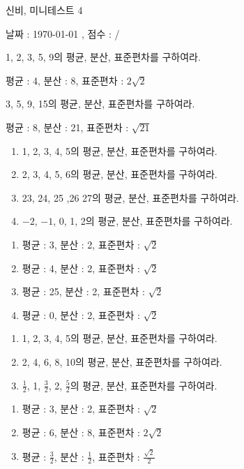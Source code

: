 \documentclass[a4paper]{oblivoir}
\begin{document}
\begin{center}
\LARGE 신비, 미니테스트 4
\end{center}
\begin{center}
날짜 : \today
,\qquad
점수 :  / 
\end{center}

%
\begin{Exercise}
1, 2, 3, 5, 9의 평균, 분산, 표준편차를 구하여라.
\end{Exercise}

\begin{Answer}
평균 : 4, 분산 : 8, 표준편차 : \(2\sqrt2\)
\end{Answer}

%
\begin{Exercise}
3, 5, 9, 15의 평균, 분산, 표준편차를 구하여라.
\end{Exercise}

\begin{Answer}
평균 : 8, 분산 : 21, 표준편차 : \(\sqrt{21}\)
\end{Answer}

%
\begin{Exercise}
\begin{enumerate}[(1)]
\item
1, 2, 3, 4, 5의 평균, 분산, 표준편차를 구하여라.
\item
2, 3, 4, 5, 6의 평균, 분산, 표준편차를 구하여라.
\item
23, 24, 25 ,26 27의 평균, 분산, 표준편차를 구하여라.
\item
$-2$, $-1$, 0, 1, 2의 평균, 분산, 표준편차를 구하여라.
\end{enumerate}
\end{Exercise}

\begin{Answer}
\begin{enumerate}[(1)]
\item
평균 : 3, 분산 : 2, 표준편차 : \(\sqrt2\)
\item
평균 : 4, 분산 : 2, 표준편차 : \(\sqrt2\)
\item
평균 : 25, 분산 : 2, 표준편차 : \(\sqrt2\)
\item
평균 : 0, 분산 : 2, 표준편차 : \(\sqrt2\)
\end{enumerate}
\end{Answer}

%
\begin{Exercise}
\begin{enumerate}[(1)]
\item
1, 2, 3, 4, 5의 평균, 분산, 표준편차를 구하여라.
\item
2, 4, 6, 8, 10의 평균, 분산, 표준편차를 구하여라.
\item
\(\frac12\), 1, \(\frac32\), 2, \(\frac52\)의 평균, 분산, 표준편차를 구하여라.
\end{enumerate}
\end{Exercise}

\begin{Answer}
\begin{enumerate}[(1)]
\item
평균 : 3, 분산 : 2, 표준편차 : \(\sqrt2\)
\item
평균 : 6, 분산 : 8, 표준편차 : \(2\sqrt2\)
\item
평균 : \(\frac32\), 분산 : \(\frac12\), 표준편차 : \(\frac{\sqrt2}2\)
\end{enumerate}
\end{Answer}

\newpage
\shipoutAnswer
\end{document}
